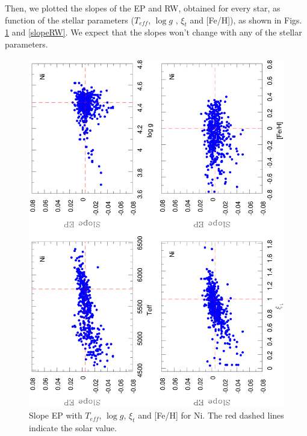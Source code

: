 \documentclass[dvips,12pt,a4paper]{report}
\begin{document}
{{ %
Then, we plotted the slopes of the EP and RW, obtained for every star, as function of the stellar parameters ($T_{eff}$, $\log g$ , $\xi_t$ and [Fe/H]), as shown in Figs. \ref{slopeEP} and \ref{slopeRW}. We expect that the slopes won't change with any of the stellar parameters.

\begin{figure}[h!]
\centering
\includegraphics[angle=-90, trim=8mm 0mm 5mm 10mm, clip,width=12 cm]{pics/parte3/EP.eps}
\caption[Slope EP with Teff, log $g$, $\xi$t and metallicity for Ni]{Slope EP with $T_{eff}$, $\log g$, $\xi_t$ and [Fe/H] for Ni. The red dashed lines indicate the solar value.}
\label{slopeEP}
\end{figure}

}}
\end{document}
